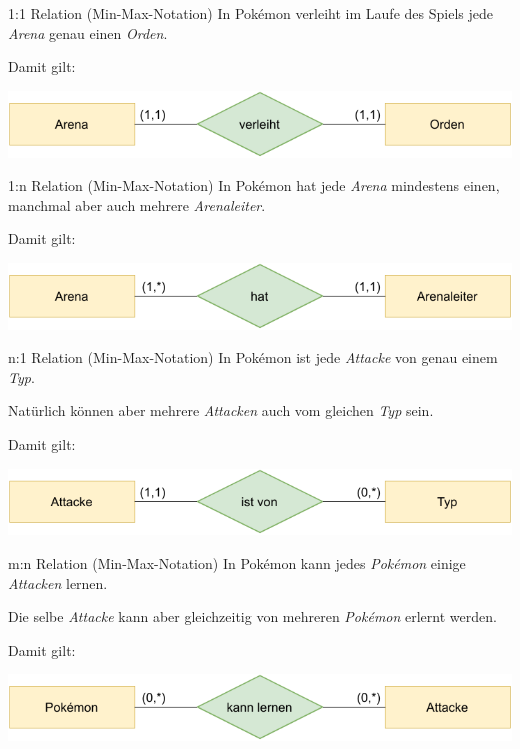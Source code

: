 \begin{example}{1:1 Relation (Min-Max-Notation)}
    In Pokémon verleiht im Laufe des Spiels jede \emph{Arena} genau einen \emph{Orden}.

    Damit gilt:
    \begin{center}
        \includegraphics[width=0.7\linewidth]{includes/figures/example_entity_relationship_modell_min_max_one_to_one.pdf}
    \end{center}
\end{example}

\begin{example}{1:n Relation (Min-Max-Notation)}
    In Pokémon hat jede \emph{Arena} mindestens einen, manchmal aber auch mehrere \emph{Arenaleiter}.

    Damit gilt:
    \begin{center}
        \includegraphics[width=0.7\linewidth]{includes/figures/example_entity_relationship_modell_min_max_one_to_many.pdf}
    \end{center}
\end{example}

\begin{example}{n:1 Relation (Min-Max-Notation)}
    In Pokémon ist jede \emph{Attacke} von genau einem \emph{Typ}.

    Natürlich können aber mehrere \emph{Attacken} auch vom gleichen \emph{Typ} sein.

    Damit gilt:
    \begin{center}
        \includegraphics[width=0.7\linewidth]{includes/figures/example_entity_relationship_modell_min_max_many_to_one.pdf}
    \end{center}
\end{example}

\begin{example}{m:n Relation (Min-Max-Notation)}
    In Pokémon kann jedes \emph{Pokémon} einige \emph{Attacken} lernen.

    Die selbe \emph{Attacke} kann aber gleichzeitig von mehreren \emph{Pokémon} erlernt werden.

    Damit gilt:
    \begin{center}
        \includegraphics[width=0.7\linewidth]{includes/figures/example_entity_relationship_modell_min_max_many_to_many.pdf}
    \end{center}
\end{example}

